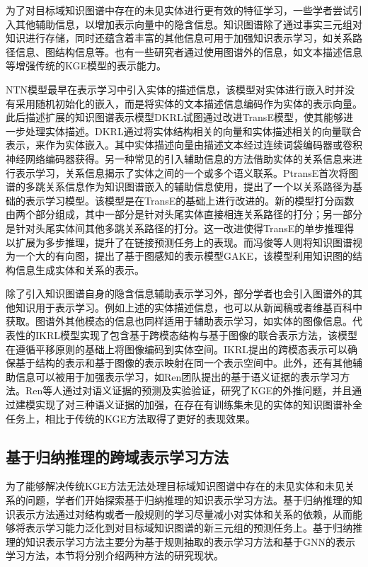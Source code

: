 为了对目标域知识图谱中存在的未见实体进行更有效的特征学习，一些学者尝试引入其他辅助信息，以增加表示向量中的隐含信息。知识图谱除了通过事实三元组对知识进行存储，同时还蕴含着丰富的其他信息可用于加强知识表示学习，如关系路径信息、图结构信息等。也有一些研究者通过使用图谱外的信息，如文本描述信息等增强传统的KGE模型的表示能力。

NTN\cite{socher2013reasoning}模型最早在表示学习中引入实体的描述信息，该模型对实体进行嵌入时并没有采用随机初始化的嵌入，而是将实体的文本描述信息编码作为实体的表示向量。此后描述扩展的知识图谱表示模型DKRL\cite{xie2016representation}试图通过改进TransE模型，使其能够进一步处理实体描述。DKRL通过将实体结构相关的向量和实体描述相关的向量联合表示，来作为实体嵌入。其中实体描述向量由描述文本经过连续词袋\cite{valverde2012link}编码器或卷积神经网络编码器获得。另一种常见的引入辅助信息的方法借助实体的关系信息来进行表示学习，关系信息揭示了实体之间的一个或多个语义联系。PtransE\cite{lin2015modeling}首次将图谱的多跳关系信息作为知识图谱嵌入的辅助信息使用，提出了一个以关系路径为基础的表示学习模型。该模型是在TransE的基础上进行改进的。新的模型打分函数由两个部分组成，其中一部分是针对头尾实体直接相连关系路径的打分；另一部分是针对头尾实体间其他多跳关系路径的打分。这一改进使得TransE的单步推理得以扩展为多步推理，提升了在链接预测任务上的表现。而冯俊等人则将知识图谱视为一个大的有向图，提出了基于图感知的表示模型GAKE\cite{feng2016gake}，该模型利用知识图的结构信息生成实体和关系的表示。

除了引入知识图谱自身的隐含信息辅助表示学习外，部分学者也会引入图谱外的其他知识用于表示学习。例如上述的实体描述信息，也可以从新闻稿或者维基百科中获取。图谱外其他模态的信息也同样适用于辅助表示学习，如实体的图像信息。代表性的IKRL\cite{xie2016image}模型实现了包含基于跨模态结构与基于图像的联合表示方法，该模型在遵循平移原则的基础上将图像编码到实体空间。IKRL提出的跨模态表示可以确保基于结构的表示和基于图像的表示映射在同一个表示空间中。此外，还有其他辅助信息可以被用于加强表示学习，如Ren\cite{li2022does}团队提出的基于语义证据的表示学习方法。Ren等人通过对语义证据的预测及实验验证，研究了KGE的外推问题，并且通过建模实现了对三种语义证据的加强，在存在有训练集未见的实体的知识图谱补全任务上，相比于传统的KGE方法取得了更好的表现效果。

\subsection{基于归纳推理的跨域表示学习方法}
为了能够解决传统KGE方法无法处理目标域知识图谱中存在的未见实体和未见关系的问题，学者们开始探索基于归纳推理的知识表示学习方法。基于归纳推理的知识表示方法通过对结构或者一般规则的学习尽量减小对实体和关系的依赖，从而能够将表示学习能力泛化到对目标域知识图谱的新三元组的预测任务上。基于归纳推理的知识表示学习方法主要分为基于规则抽取的表示学习方法和基于GNN的表示学习方法，本节将分别介绍两种方法的研究现状。


